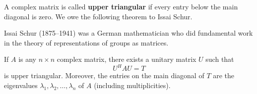 \documentclass{ximera}
\begin{document}
A complex matrix is called \textbf{upper triangular} if every entry below the main diagonal is zero. We owe the following theorem to Issai Schur.
\begin{remark}
Issai
 Schur (1875--1941) was a German mathematician who did fundamental work
in the theory of representations of groups as matrices.
\end{remark} 

\begin{theorem}\label{th:025814}
If $A$ is any $n \times n$ complex matrix, there exists a unitary matrix $U$ such that
\begin{equation*}
U^HAU = T
\end{equation*}
is upper triangular. Moreover, the entries on the main diagonal of $T$ are the eigenvalues $\lambda_{1}, \lambda_{2}, \ldots, \lambda_{n}$ of $A$ (including multiplicities).
\end{theorem}
\end{document}
